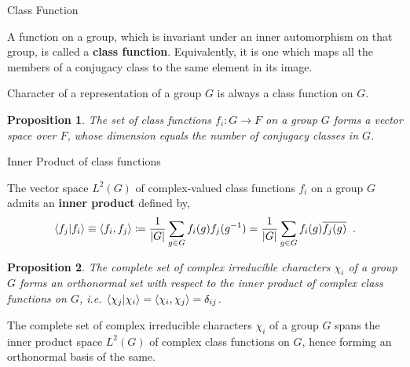 \documentclass{beamer}
\newcommand\boldtext[1]{\textcolor{bolds}{\textbf{#1}}}
\newtheorem{proposition}{Proposition}
\begin{document}
\begin{frame}{Class Function}
    \begin{definition}
        A function on a group, which is invariant under an inner automorphism on that group, is called a \boldtext{class function}. Equivalently, it is one which maps all the members of a conjugacy class to the same element in its image.
    \end{definition}
    \begin{lemma}
        Character of a representation of a group $G$ is always a class function on $G$.
    \end{lemma}
    \begin{proposition}
        The set of class functions $f_i:G\xrightarrow{}F$ on a group $G$ forms a vector space over $F$, whose dimension equals the number of conjugacy classes in $G$.
    \end{proposition}
\end{frame}

\begin{frame}{Inner Product of class functions}
    \begin{definition}
        The vector space $L^2(G)$ of complex-valued class functions $f_i$ on a group $G$ admits an \boldtext{inner product} defined by,
        \vspace{-0.75em}
        \begin{align*}
            \braket{f_j}{f_i}\equiv\langle f_i,f_j\rangle\coloneqq \frac{1}{|G|}\sum\limits_{g\in G}f_i(g)f_j(g^{-1})=\frac{1}{|G|} \sum\limits_{g\in G}f_i(g)\overline{f_j(g)}\;\;. 
        \end{align*}
    \end{definition}
    \begin{proposition}
        The complete set of complex irreducible characters $\chi_i$ of a group $G$ forms an orthonormal set with respect to the inner product of complex class functions on $G$, i.e. $\braket{\chi_j}{\chi_i}=\langle\chi_i,\chi_j\rangle=\delta_{ij}$.
    \end{proposition}
    \begin{theorem}
        The complete set of complex irreducible characters $\chi_i$ of a group $G$ spans the inner product space $L^2(G)$ of complex class functions on $G$, hence forming an orthonormal basis of the same.
    \end{theorem}
\end{frame}
\end{document}
